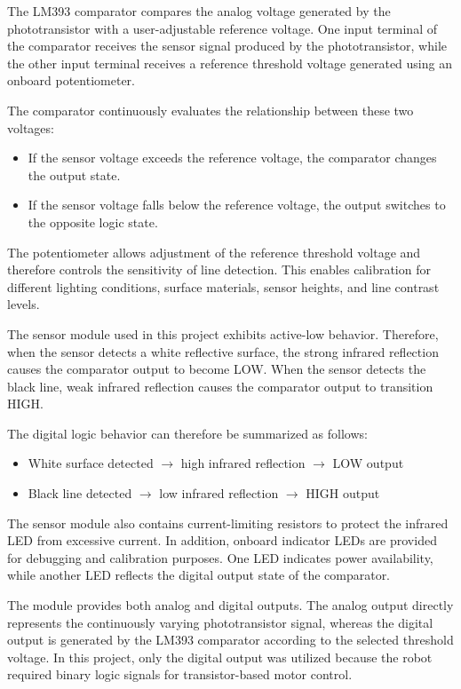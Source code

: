 \documentclass[conference]{IEEEtran}
\begin{document}
The LM393 comparator compares the analog voltage generated by the phototransistor with a user-adjustable reference voltage. One input terminal of the comparator receives the sensor signal produced by the phototransistor, while the other input terminal receives a reference threshold voltage generated using an onboard potentiometer.

The comparator continuously evaluates the relationship between these two voltages:

\begin{itemize}
    \item If the sensor voltage exceeds the reference voltage, the comparator changes the output state.
    \item If the sensor voltage falls below the reference voltage, the output switches to the opposite logic state.
\end{itemize}

The potentiometer allows adjustment of the reference threshold voltage and therefore controls the sensitivity of line detection. This enables calibration for different lighting conditions, surface materials, sensor heights, and line contrast levels.

The sensor module used in this project exhibits active-low behavior. Therefore, when the sensor detects a white reflective surface, the strong infrared reflection causes the comparator output to become LOW. When the sensor detects the black line, weak infrared reflection causes the comparator output to transition HIGH.

The digital logic behavior can therefore be summarized as follows:

\begin{itemize}
    \item White surface detected $\rightarrow$ high infrared reflection $\rightarrow$ LOW output
    \item Black line detected $\rightarrow$ low infrared reflection $\rightarrow$ HIGH output
\end{itemize}

The sensor module also contains current-limiting resistors to protect the infrared LED from excessive current. In addition, onboard indicator LEDs are provided for debugging and calibration purposes. One LED indicates power availability, while another LED reflects the digital output state of the comparator.

The module provides both analog and digital outputs. The analog output directly represents the continuously varying phototransistor signal, whereas the digital output is generated by the LM393 comparator according to the selected threshold voltage. In this project, only the digital output was utilized because the robot required binary logic signals for transistor-based motor control.
\end{document}
